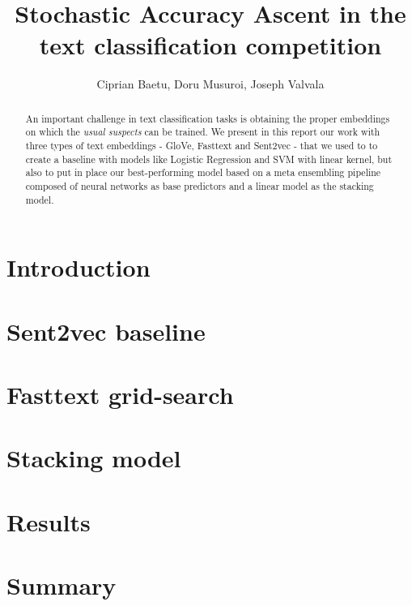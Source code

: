 \documentclass[10pt,conference,compsocconf]{IEEEtran}
\begin{document}
\title{Stochastic Accuracy Ascent in the text classification competition}

\author{
	Ciprian Baetu, Doru Musuroi, Joseph Valvala
}

\maketitle

\begin{abstract}
  An important challenge in text classification tasks is obtaining the proper embeddings
  on which the \textit{usual suspects} can be trained. We present in this report
  our work with three types of text embeddings - GloVe, Fasttext and Sent2vec - that we used to 
  to create a baseline with models like Logistic Regression and SVM with linear kernel, but also to put in place our best-performing model based on a meta ensembling pipeline composed of neural networks as base predictors and a linear model as the stacking model.
\end{abstract}

\section{Introduction}
\section{Sent2vec baseline}
\label{sec:sent2vec}
\section{Fasttext grid-search}
\label{sec:fasttext}
\section{Stacking model}
\section{Results}

\section{Summary}


\end{document}
